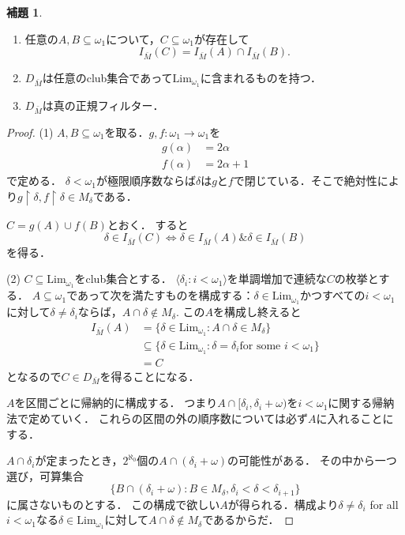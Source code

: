 \documentclass[uplatex]{jsarticle}
\newcommand{\AND}{\mathbin{\&}}
\newcommand{\restrict}{\upharpoonright}
\newcommand{\Lim}{\mathrm{Lim}}
\newcommand{\Limone}{\mathrm{Lim}_{\omega_1}}
\newcommand{\seq}[1]{{\langle#1\rangle}}
\renewcommand\subset{\subseteq}
\theoremstyle{definition}
\newtheorem{lem}[thm]{補題}
\begin{document}
	\begin{lem}
		\begin{enumerate}
			\item 任意の$A, B \subset \omega_1$について，$C \subset \omega_1$が存在して
			\[
			I_{\bar{M}}(C) = I_{\bar{M}}(A) \cap I_{\bar{M}}(B).
			\]
			\item $D_{\bar{M}}$は任意のclub集合であって$\Limone$に含まれるものを持つ．
			\item $D_{\bar{M}}$は真の正規フィルター．
		\end{enumerate}
	\end{lem}
	\begin{proof}
		(1) $A, B \subset \omega_1$を取る．$g, f \colon \omega_1 \to \omega_1$を
		\begin{align*}
		g(\alpha) &= 2 \alpha \\
		f(\alpha) &= 2 \alpha + 1
		\end{align*}
		で定める．
		$\delta < \omega_1$が極限順序数ならば$\delta$は$g$と$f$で閉じている．そこで絶対性により$g \restrict \delta, f \restrict \delta \in M_\delta$である．
		
		$C = g(A) \cup f(B)$とおく．
		すると
		\[
		\delta \in I_{\bar{M}}(C) \iff \delta \in I_{\bar{M}}(A) \AND \delta \in I_{\bar{M}}(B)
		\]
		を得る．
		
		(2) $C \subset \Lim_{\omega_1}$をclub集合とする．
		$\seq{\delta_i : i < \omega_1}$を単調増加で連続な$C$の枚挙とする．
		$A \subset \omega_1$であって次を満たすものを構成する：$\delta \in \Limone$かつすべての$i < \omega_1$に対して$\delta \ne \delta_i$ならば，$A \cap \delta \not \in M_\delta$.
		この$A$を構成し終えると
		\begin{align*}
			I_{\bar{M}}(A) &= \{ \delta \in \Limone : A \cap \delta \in M_\delta \} \\
			& \subset \{ \delta \in \Limone : \delta = \delta_i \text{for some $i<\omega_1$}  \} \\
			& = C
		\end{align*}
		となるので$C \in D_{\bar{M}}$を得ることになる．
		
		$A$を区間ごとに帰納的に構成する．
		つまり$A \cap [\delta_i, \delta_i + \omega)$を$i < \omega_1$に関する帰納法で定めていく．
		これらの区間の外の順序数については必ず$A$に入れることにする．
		
		$A \cap \delta_i$が定まったとき，$2^{\aleph_0}$個の$A \cap (\delta_i + \omega)$の可能性がある．
		その中から一つ選び，可算集合
		\[
		\{ B \cap (\delta_i + \omega) : B \in M_\delta, \delta_i < \delta < \delta_{i+1} \}
		\]
		に属さないものとする．
		この構成で欲しい$A$が得られる．構成より$\delta \ne \delta_i$ for all $i < \omega_1$なる$\delta \in \Limone$に対して$A \cap \delta \not \in M_\delta$であるからだ．
		

\end{proof}
\end{document}
